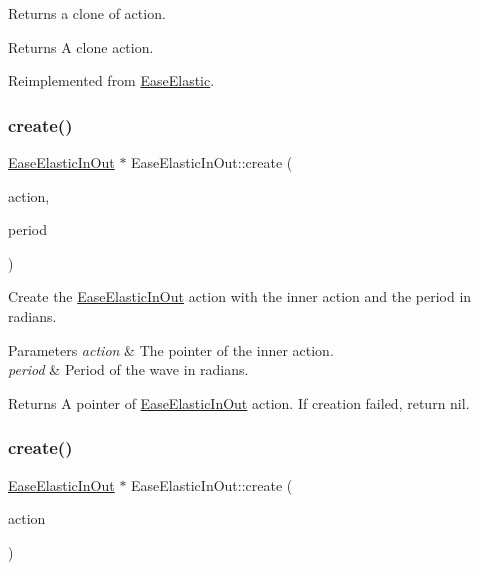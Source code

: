 Returns a clone of action.

\begin{DoxyReturn}{Returns}
A clone action. 
\end{DoxyReturn}


Reimplemented from \hyperlink{classEaseElastic_a72d5dc8a380dbb00e68c1d7c80258d28}{Ease\+Elastic}.

\mbox{\label{classEaseElasticInOut_a34e674d457e0748e1fe90b88e85f9b9e}} 
\subsubsection{\texorpdfstring{create()}{create()}\hspace{0.1cm}{\footnotesize\ttfamily [1/2]}}
{\footnotesize\ttfamily \hyperlink{classEaseElasticInOut}{Ease\+Elastic\+In\+Out} $\ast$ Ease\+Elastic\+In\+Out\+::create (\begin{DoxyParamCaption}\item[{\hyperlink{classActionInterval}{Action\+Interval} $\ast$}]{action,  }\item[{float}]{period }\end{DoxyParamCaption})\hspace{0.3cm}{\ttfamily [static]}}



Create the \hyperlink{classEaseElasticInOut}{Ease\+Elastic\+In\+Out} action with the inner action and the period in radians. 


\begin{DoxyParams}{Parameters}
{\em action} & The pointer of the inner action. \\
\hline
{\em period} & Period of the wave in radians. \\
\hline
\end{DoxyParams}
\begin{DoxyReturn}{Returns}
A pointer of \hyperlink{classEaseElasticInOut}{Ease\+Elastic\+In\+Out} action. If creation failed, return nil. 
\end{DoxyReturn}
\mbox{\label{classEaseElasticInOut_a39c8a2dae55eecb28dcf0cd1b2fb7918}} 
\subsubsection{\texorpdfstring{create()}{create()}\hspace{0.1cm}{\footnotesize\ttfamily [2/2]}}
{\footnotesize\ttfamily \hyperlink{classEaseElasticInOut}{Ease\+Elastic\+In\+Out} $\ast$ Ease\+Elastic\+In\+Out\+::create (\begin{DoxyParamCaption}\item[{\hyperlink{classActionInterval}{Action\+Interval} $\ast$}]{action }\end{DoxyParamCaption})\hspace{0.3cm}{\ttfamily [static]}}



